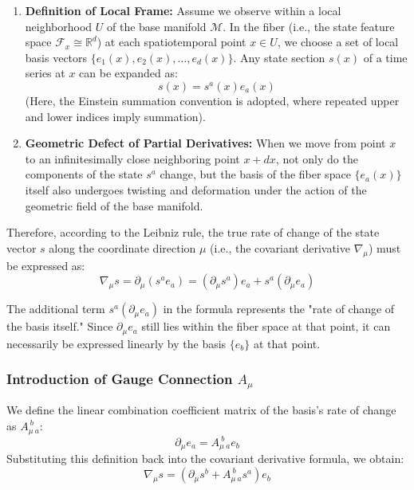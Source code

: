 \documentclass{article}
\begin{document}
\begin{enumerate}
    \item \textbf{Definition of Local Frame:} Assume we observe within a local neighborhood $U$ of the base manifold $\mathcal{M}$. In the fiber (i.e., the state feature space $\mathcal{F}_x \cong \mathbb{R}^d$) at each spatiotemporal point $x \in U$, we choose a set of local basis vectors $\{e_1(x), e_2(x), \dots, e_d(x)\}$. Any state section $s(x)$ of a time series at $x$ can be expanded as:
    \begin{equation}
    s(x) = s^a(x) e_a(x)
    \end{equation}
    (Here, the Einstein summation convention is adopted, where repeated upper and lower indices imply summation).
    
    \item \textbf{Geometric Defect of Partial Derivatives:} When we move from point $x$ to an infinitesimally close neighboring point $x + dx$, not only do the components of the state $s^a$ change, but the basis of the fiber space $\{e_a(x)\}$ itself also undergoes twisting and deformation under the action of the geometric field of the base manifold.
\end{enumerate}

Therefore, according to the Leibniz rule, the true rate of change of the state vector $s$ along the coordinate direction $\mu$ (i.e., the covariant derivative $\nabla_\mu$) must be expressed as:
\begin{equation}
\nabla_\mu s = \partial_\mu (s^a e_a) = (\partial_\mu s^a) e_a + s^a (\partial_\mu e_a)
\end{equation}

The additional term $s^a (\partial_\mu e_a)$ in the formula represents the "rate of change of the basis itself." Since $\partial_\mu e_a$ still lies within the fiber space at that point, it can necessarily be expressed linearly by the basis $\{e_b\}$ at that point.

\subsubsection{Introduction of Gauge Connection \texorpdfstring{$A_\mu$}{A-mu}}

We define the linear combination coefficient matrix of the basis's rate of change as $A_{\mu \ a}^{\ b}$:
\begin{equation}
\partial_\mu e_a = A_{\mu \ a}^{\ b} e_b
\end{equation}
Substituting this definition back into the covariant derivative formula, we obtain:
\begin{equation}
\nabla_\mu s = (\partial_\mu s^b + A_{\mu \ a}^{\ b} s^a) e_b
\end{equation}
\end{document}
